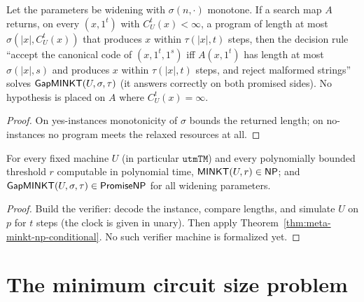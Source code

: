 \begin{lemma}
  \label{lem:meta-gapminkt-search}
  \leanok
  Let the parameters be widening with $\sigma(n, \cdot)$ monotone. If a search
  map $A$ returns, on every $(x, 1^t)$ with $C^t_U(x) < \infty$, a program of
  length at most $\sigma(|x|, C^t_U(x))$ that produces $x$ within
  $\tau(|x|, t)$ steps, then the decision rule ``accept the canonical code of
  $(x,1^t,1^s)$ iff $A(x,1^t)$ has length at most $\sigma(|x|,s)$ and produces
  $x$ within $\tau(|x|,t)$ steps, and reject malformed strings'' solves
  $\mathsf{GapMINKT}(U, \sigma, \tau)$ (it answers correctly on both promised
  sides). No hypothesis is placed on $A$ where $C^t_U(x) = \infty$.
\end{lemma}
\begin{proof}
  \leanok
  On yes-instances monotonicity of $\sigma$ bounds the returned length; on
  no-instances no program meets the relaxed resources at all.
\end{proof}

\begin{theorem}
  \label{thm:meta-minkt-in-np}
  For every fixed machine $U$ (in particular $\mathtt{utmTM}$) and every
  polynomially bounded threshold $r$ computable in polynomial time,
  $\mathsf{MINKT}(U, r) \in \mathsf{NP}$; and $\mathsf{GapMINKT}(U, \sigma, \tau) \in
  \mathsf{PromiseNP}$ for all widening parameters.
\end{theorem}
\begin{proof}
  Build the verifier: decode the instance, compare lengths, and simulate $U$ on
  $p$ for $t$ steps (the clock is given in unary). Then apply
  Theorem~\ref{thm:meta-minkt-np-conditional}. No such verifier machine is
  formalized yet.
\end{proof}

\section{The minimum circuit size problem}

